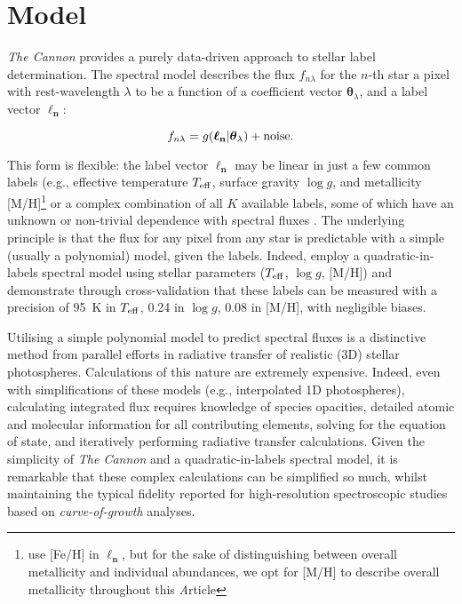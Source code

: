 \documentclass[useAMS,usenatbib]{mn2e}
\newcommand\article{\textit Article}
\newcommand\tc{\textit{The Cannon} }
\newcommand\lv{\mathbf{\boldsymbol\ell_n}}
\newcommand\cv{{\boldsymbol\theta}_\lambda}
\newcommand\given{|}
\begin{document}

\section{Model}

\tc{} provides a purely data-driven approach to stellar label determination. The
spectral model describes the flux $f_{n\lambda}$ for the $n$-th star a pixel with rest-wavelength $\lambda$ to be a function
of a coefficient vector $\cv$, and a label vector $\lv$:

\begin{equation}
    f_{n\lambda} = g(\lv\given\cv) + {\rm noise}.
\end{equation}

This form is flexible: the label vector $\lv$ may be linear in just a few common
labels (e.g., effective temperature $T_{\rm eff}$, surface gravity $\log{g}$, and
metallicity [M/H]\footnote{\citet{Ness2015} use [Fe/H] in $\lv$, but for the 
sake of distinguishing between overall metallicity and individual abundances,
we opt for [M/H] to describe overall metallicity throughout this \article{}} 
or a complex combination of all $K$ available labels, some of which have an
 unknown or non-trivial dependence with spectral fluxes \citep[e.g., mass, 
 ages, see][]{ness_2015b}. The underlying principle
is that the flux for any pixel from any star is predictable with a simple (usually
 a polynomial) model, given the labels. Indeed, \citet{Ness2015}
employ a quadratic-in-labels spectral model using stellar
parameters ($T_{\rm eff}$, $\log{g}$, [M/H])
and demonstrate through cross-validation that these labels can be 
measured with a precision of 95~K in $T_{\rm eff}$, 0.24 in $\log{g}$, 0.08 in 
[M/H], with negligible biases. 

Utilising a simple polynomial model to predict spectral fluxes is a distinctive
method from parallel efforts in radiative transfer of realistic (3D) stellar 
photospheres. Calculations of this nature are extremely expensive. Indeed, even
with simplifications of these models (e.g., interpolated 1D photospheres),
calculating integrated flux requires knowledge of species opacities, detailed 
atomic and molecular information for all contributing elements, solving for
the equation of state, and iteratively performing radiative transfer calculations. Given the
simplicity of \tc{} and a quadratic-in-labels spectral model, it is remarkable
that these complex calculations can be simplified so much, whilst maintaining
the typical fidelity reported for high-resolution spectroscopic studies based on
\textit{curve-of-growth} analyses.
\end{document}

